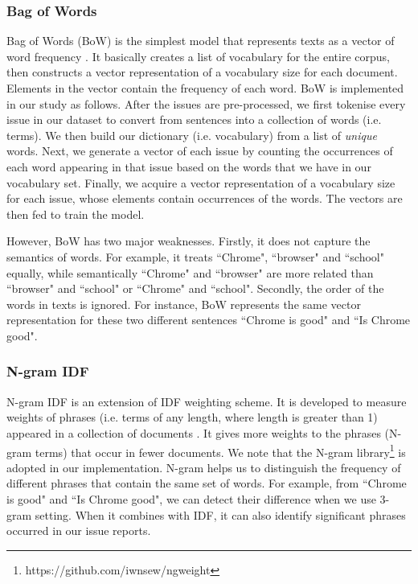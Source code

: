 \subsubsection{Bag of Words} \label{subsec:BoW}

Bag of Words (BoW)  is the simplest model that represents texts as a vector of word frequency \cite{Tirilly2008}. It basically creates a list of vocabulary for the entire corpus, then constructs a vector representation of a vocabulary size for each document. Elements in the vector contain the frequency of each word. BoW is implemented in our study as follows. After the issues are pre-processed, we first tokenise every issue in our dataset to convert from sentences into a collection of words (i.e. terms). We then build our dictionary (i.e. vocabulary) from a list of \emph{unique} words. Next, we generate a vector of each issue by counting the occurrences of each word appearing in that issue based on the words that we have in our vocabulary set. Finally, we acquire a vector representation of a vocabulary size for each issue, whose elements contain occurrences of the words. The vectors are then fed to train the model.

However, BoW has two major weaknesses. Firstly, it does not capture the semantics of words. For example, it treats ``Chrome", ``browser" and ``school" equally, while semantically ``Chrome" and ``browser" are more related than ``browser" and ``school" or ``Chrome" and ``school". Secondly, the order of the words in texts is ignored. For instance, BoW represents the same vector representation for these two different sentences ``Chrome is good" and ``Is Chrome good".

\subsubsection{N-gram IDF}\label{subsec:N-gram}

N-gram IDF is an extension of IDF weighting scheme. It is developed to measure weights of phrases (i.e. terms of any length, where length is greater than 1) appeared in a collection of documents \cite{Shirakawa2015}. It gives more weights to the phrases (N-gram terms) that occur in fewer documents. We note that the N-gram library\footnote{https://github.com/iwnsew/ngweight} is adopted in our implementation. N-gram helps us to distinguish the frequency of different phrases that contain the same set of words. For example, from ``Chrome is good" and ``Is Chrome good", we can detect their difference when we use 3-gram setting. When it combines with IDF, it can also identify significant phrases occurred in our issue reports.

